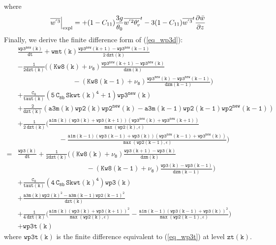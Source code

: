 \documentclass[11pt,fleqn]{article}
\newcommand{\ptlder}[2]{\frac{\partial #1}{\partial #2}}
\begin{document}
%
where
%
\begin{equation}
\label{eq_wp3t}
\left. \overline{w^{'3}} \right|_{\rm expl}
= 
  + (1 - C_{11}) \frac{3g}{\theta_0} \overline{w^{'2}\theta'_v}^t
  - 3 ( 1 - C_{11} ) \overline{w^{'3}}^t\ptlder{\bar{w}}{z}
\end{equation}
%
Finally, we derive the finite difference form of (\ref{eq_wp3d}):
%
\begin{equation}
\label{eq_wp3e}
\begin{split}
& \mathtt{
  \frac{wp3^{new}(k)}{dt}
  + wmt(k) \frac{wp3^{new}(k+1)-wp3^{new}(k-1)}{2 \ dzt(k)}
  } \\
& \mathtt{
  - \frac{1}{2dzt(k)} 
    \bigg( 
            \left(Kw8(k)+\nu_8\right)
            \frac{wp3^{new}(k+1)-wp3^{new}(k)}{dzm(k)} }  \\
& \mathtt{ \qquad \qquad \qquad \qquad
          - \left(Kw8(k-1)+\nu_8\right)
            \frac{wp3^{new}(k)-wp3^{new}(k-1)}{dzm(k-1)}
    \bigg)
  } \\
& \mathtt{
+ \frac{C_8}{taut(k)}
   \left(  5 \, C_{8b} \, {Skwt(k)}^4 + 1 \right) wp3^{new}(k)
  } \\
& \mathtt{
  + \frac{2}{dzt(k)} 
    \left(a3m(k) wp2(k) wp2^{new}(k) - a3m(k-1) wp2(k-1) wp2^{new}(k-1) \right)
  } \\
& \mathtt{
  + \frac{1}{2 \, dzt(k)}
    \bigg(
      \frac{ a1m(k)
             \left(wp3(k)+wp3(k+1)\right)
             \left(wp3^{new}(k)+wp3^{new}(k+1)\right) }
           { \max\left( wp2(k), \epsilon \right) }
  } \\
& \mathtt{ \quad \quad \quad \quad \quad \quad
     -\frac{ a1m(k-1) 
             \left(wp3(k-1)+wp3(k)\right)
             \left(wp3^{new}(k-1)+wp3^{new}(k)\right) }
           { \max\left( wp2(k-1), \epsilon \right) }
    \bigg)
  } \\
=& \mathtt{
  \frac{wp3(k)}{dt} 
  + \frac{1}{2dzt(k)} 
    \bigg( 
            \left(Kw8(k)+\nu_8\right)
            \frac{wp3(k+1)-wp3(k)}{dzm(k)} }  \\
& \mathtt{ \qquad \qquad \qquad \qquad \qquad
          - \left(Kw8(k-1)+\nu_8\right)
            \frac{wp3(k)-wp3(k-1)}{dzm(k-1)}
    \bigg)
  } \\
& \mathtt{
+ \frac{C_8}{taut(k)}
   \left( 4 \, C_{8b} \, {Skwt(k)}^4 \right) wp3(k)
  } \\
& \mathtt{
  + \frac{a3m(k) wp2(k)^2 - a3m(k-1) wp2(k-1)^2 }
         {dzt(k)}
  } \\
& \mathtt{
  + \frac{1}{4 \, dzt(k)}
    \bigg(
      \frac{ a1m(k) 
             \left(wp3(k)+wp3(k+1)\right)^2 }
           { \max\left( wp2(k), \epsilon \right) }
     -\frac{ a1m(k-1)
             \left(wp3(k-1)+wp3(k)\right)^2 }
           { \max\left( wp2(k-1), \epsilon \right) }
    \bigg)
  } \\
& \mathtt{
+ wp3t(k)
  }
\end{split}
\end{equation}
%
where $\mathtt{wp3t(k)}$ is the finite difference equivalent to (\ref{eq_wp3t}) 
at level $\mathtt{zt(k)}$.
%
\end{document}
